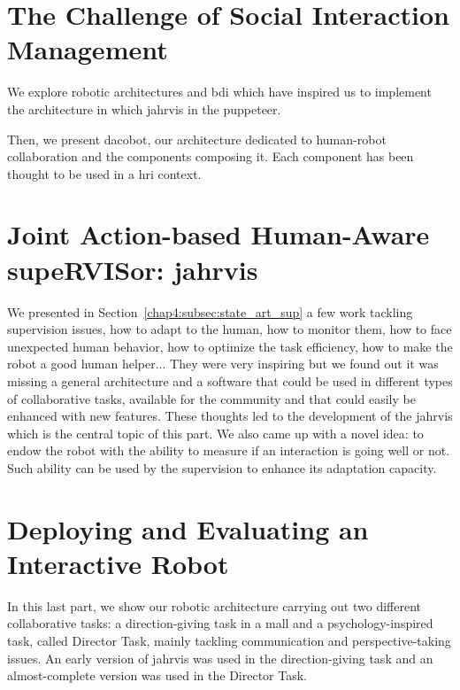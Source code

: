 \documentclass[english,a4paper,11pt,twoside]{StyleThese}
\begin{document}
\part{The Challenge of Social Interaction Management}\label{part:part2}
\begin{partintro}
	We explore robotic architectures and \acrfull{bdi} which have inspired us to implement the architecture in which \acrshort{jahrvis} in the puppeteer.
	
	Then, we present \acrfull{dacobot}, our architecture dedicated to human-robot collaboration and the components composing it. Each component has been thought to be used in a \acrshort{hri} context.
\end{partintro}	



\part{Joint Action-based Human-Aware supeRVISor: \acrshort{jahrvis}}\label{part:part3}
\begin{partintro}
	We presented in Section~\ref{chap4:subsec:state_art_sup} a few work tackling supervision issues, \ie how to adapt to the human, how to monitor them, how to face unexpected human behavior, how to optimize the task efficiency, how to make the robot a good human helper... They were very inspiring but we found out it was missing a general architecture and a software that could be used in different types of collaborative tasks, available for the community and that could easily be enhanced with new features. These thoughts led to the development of the \acrfull{jahrvis} which is the central topic of this part. We also came up with a novel idea: to endow the robot with the ability to measure if an interaction is going well or not. Such ability can be used by the supervision to enhance its adaptation capacity.
\end{partintro}





\part{Deploying and Evaluating an Interactive Robot}\label{part:part4}
\begin{partintro}
	In this last part, we show our robotic architecture carrying out two different collaborative tasks: a direction-giving task in a mall and a psychology-inspired task, called Director Task, mainly tackling communication and perspective-taking issues. An early version of \acrshort{jahrvis} was used in the direction-giving task and an almost-complete version was used in the Director Task.
\end{partintro}	


\end{document}
